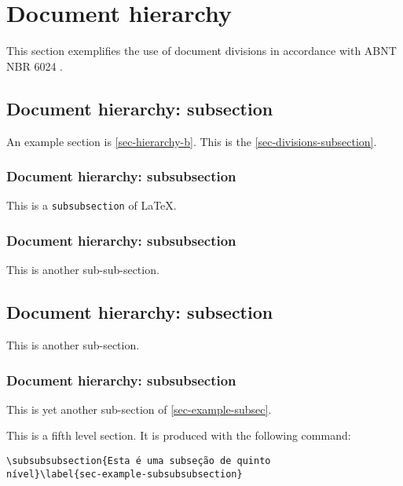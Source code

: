 \section{Document hierarchy}\label{sec-hierarchy-b}

This section exemplifies the use of document divisions in accordance with ABNT NBR 6024 \cite{nbr6024}.
\subsection{Document hierarchy: subsection}\label{sec-hierarchy-subsection}

An example section is \autoref{sec-hierarchy-b}. This is the \autoref{sec-divisions-subsection}.

\subsubsection{Document hierarchy: subsubsection}\label{sec-hierarchy-subsubsection}

This is a \texttt{subsubsection} of \LaTeX.

\subsubsection{Document hierarchy: subsubsection}

This is another sub-sub-section.

\subsection{Document hierarchy: subsection}\label{sec-example-subsec}

This is another sub-section.

\subsubsection{Document hierarchy: subsubsection}

This is yet another sub-section of \autoref{sec-example-subsec}.

\label{sec-example-subsubsubsection}

This is a fifth level section. It is produced with the following command:

\begin{verbatim}
\subsubsubsection{Esta é uma subseção de quinto
nível}\label{sec-example-subsubsubsection}
\end{verbatim}

